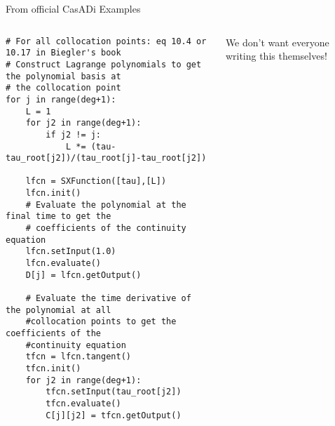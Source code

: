 \documentclass[xcolor=dvipsnames]{beamer}
\begin{document}
\begin{frame}[fragile]{From official CasADi Examples}

\begin{columns}
    \begin{column}{.75\textwidth}
        
\begin{lstlisting}[style=python,basicstyle=\ttfamily\fontsize{6}{8}\selectfont]
# For all collocation points: eq 10.4 or 10.17 in Biegler's book
# Construct Lagrange polynomials to get the polynomial basis at
# the collocation point
for j in range(deg+1):
    L = 1
    for j2 in range(deg+1):
        if j2 != j:
            L *= (tau-tau_root[j2])/(tau_root[j]-tau_root[j2])
    
    lfcn = SXFunction([tau],[L])
    lfcn.init()
    # Evaluate the polynomial at the final time to get the
    # coefficients of the continuity equation
    lfcn.setInput(1.0)
    lfcn.evaluate()
    D[j] = lfcn.getOutput()
    
    # Evaluate the time derivative of the polynomial at all
    #collocation points to get the coefficients of the
    #continuity equation
    tfcn = lfcn.tangent()
    tfcn.init()
    for j2 in range(deg+1):
        tfcn.setInput(tau_root[j2])
        tfcn.evaluate()
        C[j][j2] = tfcn.getOutput()
\end{lstlisting}
    \end{column}
    \begin{column}{.25\textwidth}
        We don't want everyone writing this themselves!
    \end{column}
\end{columns}

\end{frame}
\end{document}
